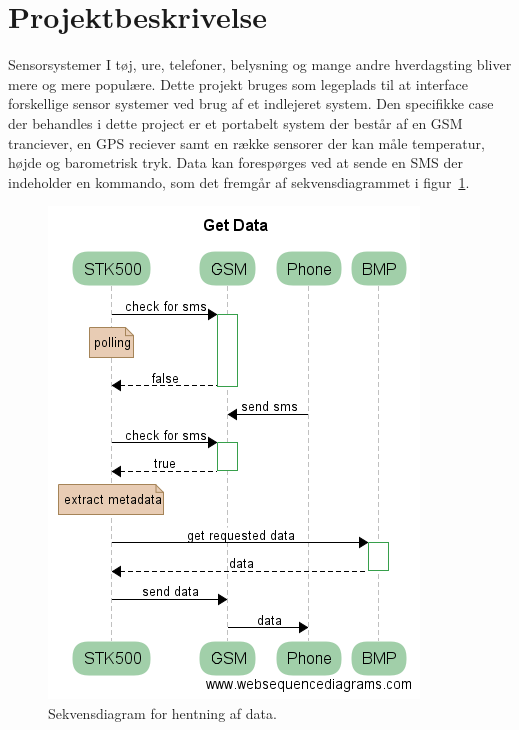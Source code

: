 \section{Projektbeskrivelse}

Sensorsystemer I tøj, ure, telefoner, belysning og mange andre hverdagsting bliver mere og mere populære. 
Dette projekt bruges som legeplads til at interface forskellige sensor systemer ved brug af et indlejeret system.
Den specifikke case der behandles i dette project er et portabelt system der består af en GSM tranciever, en GPS reciever samt en række sensorer der kan måle temperatur, højde og barometrisk tryk. 
Data kan forespørges ved at sende en SMS der indeholder en kommando, som det fremgår af sekvensdiagrammet i figur~\ref{fig:seq-getdata}.

\begin{figure}[h]
	\centering
	\includegraphics[width=0.7\linewidth]{figs/seq-getdata.png}
	\caption{Sekvensdiagram for hentning af data.}
	\label{fig:seq-getdata}
\end{figure}
